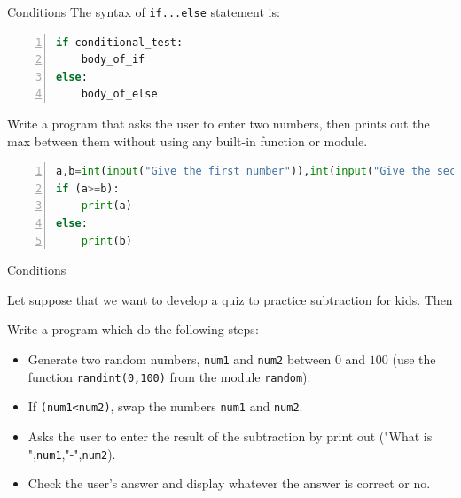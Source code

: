 \begin{frame}[fragile]{Conditions}
The syntax of \texttt{if...else} statement is:
\begin{lstlisting}[numbers=left,showstringspaces=false,language=python]
if conditional_test:
    body_of_if
else:
    body_of_else
\end{lstlisting}
\pause
\begin{example}
Write a program that asks the user to enter two numbers, then prints out the max between them without using any built-in function or module.
\end{example}
\pause
\begin{lstlisting}[numbers=left,showstringspaces=false,language=python]
a,b=int(input("Give the first number")),int(input("Give the second number"))
if (a>=b):
    print(a)
else:
    print(b)
\end{lstlisting}
\end{frame}
\begin{frame}[fragile]{Conditions}
\begin{example}
    Let suppose that we want to develop a quiz to practice subtraction for kids. Then


    Write a program which do the following steps:
    \begin{itemize}
        \item Generate two random numbers, \texttt{num1} and \texttt{num2} between $0$ and $100$ (use the function
         \texttt{randint(0,100)} from the module \texttt{random}).
         \item If \texttt{(num1<num2)}, swap the numbers \texttt{num1} and \texttt{num2}. 
         \item Asks the user to enter the result of the subtraction by print out ("What is ",\texttt{num1},"-",\texttt{num2}).
         \item Check the user's answer and display whatever the answer is correct or no.
    \end{itemize}
\end{example}        
\end{frame}
